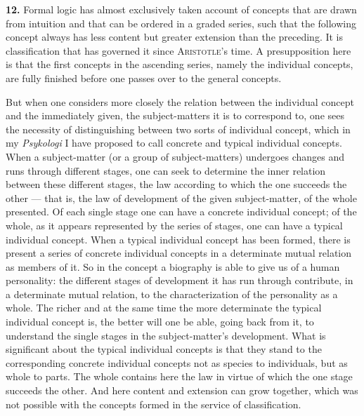 \documentclass[12pt]{book}
\newcommand{\hnum}[1]{\textbf{#1.}\enspace}
\newcommand{\opage}[1]{\marginnote{\footnotesize\textit{[#1]}}}
\begin{document}
\hnum{12} Formal logic has almost exclusively taken account of concepts that are
drawn from intuition and that can be ordered in a graded series, such that the
following concept always has less content but greater extension than the
\opage{33}preceding. It is classification that has governed it since \textsc{Aristotle}'s
time. A presupposition here is that the first concepts in the ascending series,
namely the individual concepts, are fully finished before one passes over to the
general concepts.

But when one considers more closely the relation between the individual concept
and the immediately given, the subject-matters it is to correspond to, one sees
the necessity of distinguishing between two sorts of individual concept, which in
my \textit{Psykologi} I have proposed to call concrete and typical individual
concepts. When a subject-matter (or a group of subject-matters) undergoes changes
and runs through different stages, one can seek to determine the inner relation
between these different stages, the law according to which the one succeeds the
other --- that is, the law of development of the given subject-matter, of the
whole presented. Of each single stage one can have a concrete individual concept;
of the whole, as it appears represented by the series of stages, one can have a
typical individual concept. When a typical individual concept has been formed,
there is present a series of concrete individual concepts in a determinate mutual
relation as members of it. So in the concept a biography is able to give us of a
human personality: the different stages of development it has run through
contribute, in a determinate mutual relation, to the characterization of the
personality as a whole. The richer and at the same time the more determinate the
typical individual concept is, the better will one be able, going back from it, to
understand the single stages in the subject-matter's development. What is
significant about the typical individual concepts is that they stand to the
corresponding concrete individual concepts not as species to individuals, but as
whole to parts. The whole contains here the law in virtue of which the one stage
succeeds the other. And here content and extension can grow together, which was
not possible with the concepts formed in the service of classification.
\end{document}
